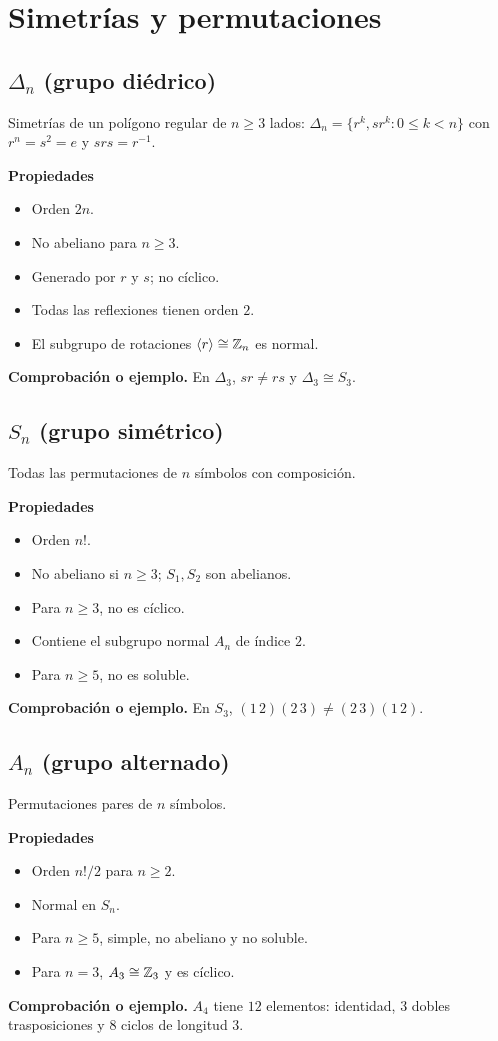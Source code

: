 \documentclass[11pt,a4paper]{article}
\begin{document}
\section{Simetrías y permutaciones}

\subsection{$\Delta_n$ (grupo diédrico)}
\begin{ejemplo}
Simetrías de un polígono regular de $n\ge3$ lados: $\Delta_n=\{r^k,sr^k:0\le k<n\}$ con $r^n=s^2=e$ y $srs=r^{-1}$.
\end{ejemplo}
\textbf{Propiedades}
\begin{itemize}
\item Orden $2n$.
\item No abeliano para $n\ge3$.
\item Generado por $r$ y $s$; no cíclico.
\item Todas las reflexiones tienen orden $2$.
\item El subgrupo de rotaciones $\langle r\rangle\cong\mathbb{Z}_n$ es normal.
\end{itemize}
\textbf{Comprobación o ejemplo.} En $\Delta_3$, $sr\ne rs$ y $\Delta_3\cong S_3$.

\subsection{$S_n$ (grupo simétrico)}
\begin{ejemplo}
Todas las permutaciones de $n$ símbolos con composición.
\end{ejemplo}
\textbf{Propiedades}
\begin{itemize}
\item Orden $n!$.
\item No abeliano si $n\ge3$; $S_1,S_2$ son abelianos.
\item Para $n\ge3$, no es cíclico.
\item Contiene el subgrupo normal $A_n$ de índice $2$.
\item Para $n\ge5$, no es soluble.
\end{itemize}
\textbf{Comprobación o ejemplo.} En $S_3$, $(1\,2)(2\,3)\ne(2\,3)(1\,2)$.

\subsection{$A_n$ (grupo alternado)}
\begin{ejemplo}
Permutaciones pares de $n$ símbolos.
\end{ejemplo}
\textbf{Propiedades}
\begin{itemize}
\item Orden $n!/2$ para $n\ge2$.
\item Normal en $S_n$.
\item Para $n\ge5$, simple, no abeliano y no soluble.
\item Para $n=3$, $A_3\cong\mathbb{Z}_3$ y es cíclico.
\end{itemize}
\textbf{Comprobación o ejemplo.} $A_4$ tiene $12$ elementos: identidad, $3$ dobles trasposiciones y $8$ ciclos de longitud $3$.
\end{document}
